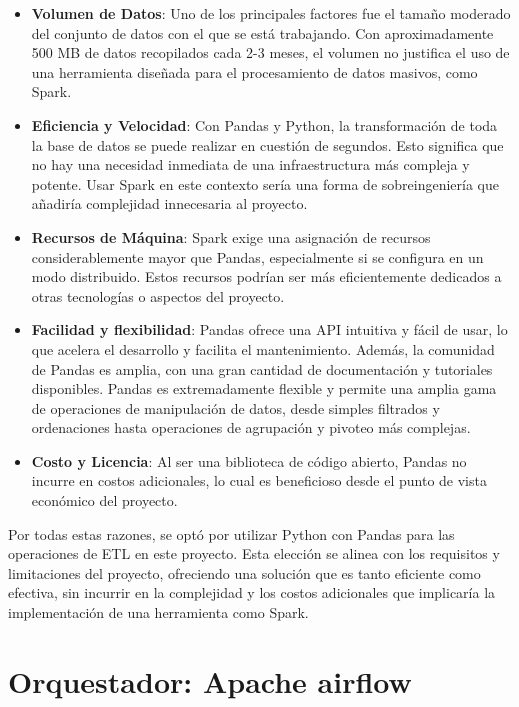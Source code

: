 \begin{itemize}
\item \textbf{Volumen de Datos}: Uno de los principales factores fue el tamaño moderado del conjunto de datos con el que se está trabajando. Con aproximadamente 500 MB de datos recopilados cada 2-3 meses, el volumen no justifica el uso de una herramienta diseñada para el procesamiento de datos masivos, como Spark.

\item \textbf{Eficiencia y Velocidad}: Con Pandas y Python, la transformación de toda la base de datos se puede realizar en cuestión de segundos. Esto significa que no hay una necesidad inmediata de una infraestructura más compleja y potente. Usar Spark en este contexto sería una forma de sobreingeniería que añadiría complejidad innecesaria al proyecto.

\item \textbf{Recursos de Máquina}: Spark exige una asignación de recursos considerablemente mayor que Pandas, especialmente si se configura en un modo distribuido. Estos recursos podrían ser más eficientemente dedicados a otras tecnologías o aspectos del proyecto.

\item \textbf{Facilidad y flexibilidad}: Pandas ofrece una API intuitiva y fácil de usar, lo que acelera el desarrollo y facilita el mantenimiento. Además, la comunidad de Pandas es amplia, con una gran cantidad de documentación y tutoriales disponibles. Pandas es extremadamente flexible y permite una amplia gama de operaciones de manipulación de datos, desde simples filtrados y ordenaciones hasta operaciones de agrupación y pivoteo más complejas.

\item \textbf{Costo y Licencia}: Al ser una biblioteca de código abierto, Pandas no incurre en costos adicionales, lo cual es beneficioso desde el punto de vista económico del proyecto.
\end{itemize}

Por todas estas razones, se optó por utilizar Python con Pandas para las operaciones de ETL en este proyecto. Esta elección se alinea con los requisitos y limitaciones del proyecto, ofreciendo una solución que es tanto eficiente como efectiva, sin incurrir en la complejidad y los costos adicionales que implicaría la implementación de una herramienta como Spark.

\section{Orquestador: Apache airflow}

